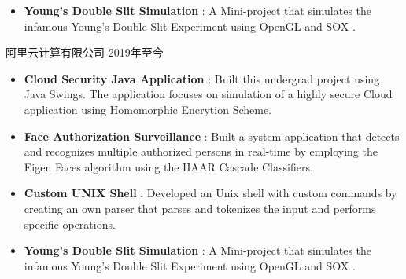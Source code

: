\documentclass[margin, centered]{res}
\begin{document}
\begin{resume}
\begin{itemize}[leftmargin=*]
            \item \textbf{{Young's Double Slit Simulation }}: A Mini-project that simulates the infamous Young's Double Slit Experiment using OpenGL and SOX .

        \end{itemize}



        阿里云计算有限公司  \hfill 2019年至今
        \\
        \begin{itemize}[leftmargin=*]


            \item \textbf{{Cloud Security Java Application }}: Built this undergrad project using Java Swings. The application focuses on simulation of a highly secure Cloud application using Homomorphic Encrytion Scheme.

            \item \textbf{{Face Authorization Surveillance }} : Built a system application that detects and recognizes
            multiple authorized persons in real-time by employing the Eigen Faces algorithm using the HAAR Cascade Classifiers.

            \item \textbf{{Custom UNIX Shell}} : Developed an Unix shell with custom commands by creating an own parser that parses and tokenizes the input and performs specific operations.

            \item \textbf{{Young's Double Slit Simulation }}: A Mini-project that simulates the infamous Young's Double Slit Experiment using OpenGL and SOX .

        \end{itemize}




\end{resume}
\end{document}
